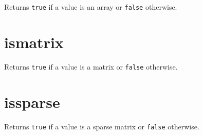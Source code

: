 Returns \texttt{true} if a value is an array or \texttt{false}
otherwise.

\hypertarget{ismatrix}{%
\section{ismatrix}\label{ismatrix}}

Returns \texttt{true} if a value is a matrix or \texttt{false}
otherwise.

\hypertarget{issparse}{%
\section{issparse}\label{issparse}}

Returns \texttt{true} if a value is a sparse matrix or \texttt{false}
otherwise.
